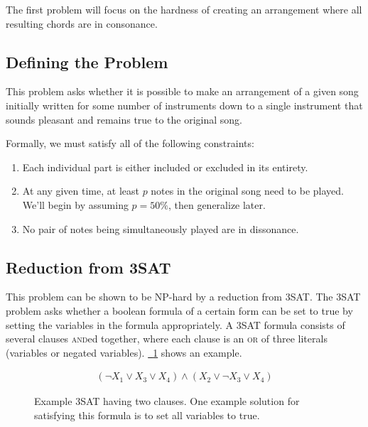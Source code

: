 \documentclass[11pt,letterpaper]{article}
\newcommand{\figref}[2][{}]{\hyperref[#2]{\figurename~\ref{#2}#1}}
\begin{document}
The first problem will focus on the hardness of creating an arrangement where all resulting chords are in consonance.

\subsection{Defining the Problem}
This problem asks whether it is possible to make an arrangement of a given song initially written for some number of instruments down to a single instrument that sounds pleasant and remains true to the original song.

Formally, we must satisfy all of the following constraints:
\begin{enumerate}
\item Each individual part is either included or excluded in its entirety.
\item At any given time, at least $p$ notes in the original song need to be played. We'll begin by assuming $p=50\%$, then generalize later.
\item No pair of notes being simultaneously played are in dissonance.
\end{enumerate}

\subsection{Reduction from 3SAT} \label{3SAT}
This problem can be shown to be NP-hard by a reduction from 3SAT. The 3SAT problem asks whether a boolean formula of a certain form can be set to true by setting the variables in the formula appropriately. A 3SAT formula consists of several clauses \textsc{and}ed together, where each clause is an \textsc{or} of three literals (variables or negated variables).  \figref{sat} shows an example.

\begin{figure}[h!]
  \begin{align*}
  (\neg X_1 \vee X_3 \vee X_4) \wedge (X_2 \vee \neg X_3 \vee X_4)
  \end{align*}
  \caption{Example 3SAT having two clauses. One example solution for satisfying this formula is to set all variables to true.}
  \label{sat}
\end{figure}
\end{document}

